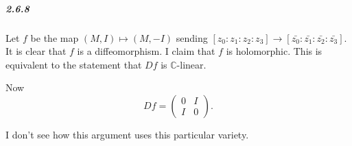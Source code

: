 \documentclass[10pt,letter]{article}
\begin{document}
\subparagraph{2.6.8} Let $f$ be the map $(M,I) \mapsto (M,-I)$ sending $[z_0:z_1:z_2:z_3] \rightarrow [\bar{z_0}:\bar{z_1}:\bar{z_2}:\bar{z_3}]$. It is clear that $f$ is a diffeomorphism. I claim that $f$ is holomorphic. This is equivalent to the statement that $Df$ is $\mathbb{C}$-linear.  

Now \[ Df = \left( \begin{array}{cc} 0 & I \\ I & 0 \end{array} \right).\]  

I don't see how this argument uses this particular variety. 
\end{document}

